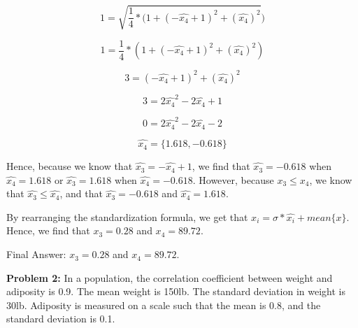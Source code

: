\documentclass{article}
\begin{document}
 \begin{displaymath}
 1 = \sqrt{\frac{1}{4}*(1+(-\hat{x_{4}}+1)^2+(\hat{x_{4}})^2})
 \end{displaymath}
 
 \begin{displaymath}
 1 = \frac{1}{4}*(1+(-\hat{x_{4}}+1)^2+(\hat{x_{4}})^2)
 \end{displaymath}
 
 \begin{displaymath}
 3 = (-\hat{x_{4}}+1)^2+(\hat{x_{4}})^2
 \end{displaymath}
 
 \begin{displaymath}
 3 = 2\hat{x_4}^2 - 2\hat{x_4} + 1
 \end{displaymath}
 
 \begin{displaymath}
 0 = 2\hat{x_4}^2 - 2\hat{x_4} - 2
 \end{displaymath}
 
 \begin{displaymath}
 \hat{x_4} = \{1.618, -0.618\}
 \end{displaymath}
 
 Hence, because we know that $\hat{x_3} = -\hat{x_4} + 1$, we find that $\hat{x_3} = -0.618$ when $\hat{x_4} = 1.618$ or $\hat{x_3} = 1.618$ when $\hat{x_4} = -0.618$. However, because $x_3 \leq x_4$, we know that $\hat{x_3} \leq \hat{x_4}$, and that $\hat{x_3} = -0.618$ and $\hat{x_4} = 1.618$.\newline
 
 By rearranging the standardization formula, we get that $x_i = \sigma * \hat{x_i} + mean\{x\}$. Hence, we find that $x_3 = 0.28$ and $x_4 = 89.72$.\newline
 
 Final Answer: $x_3 = 0.28$ and $x_4 = 89.72$. \newline

 \newpage
 
 \noindent\makebox[\linewidth]{\rule{\paperwidth}{0.4pt}}\newline
 
 \begin{center}
      \Large\textbf{Problem 2:} In a population, the correlation coefficient between weight and adiposity is 0.9. The mean weight is 150lb. The standard deviation in weight is 30lb. Adiposity is measured on a scale such that the mean is 0.8, and the standard deviation is 0.1.\par
 \end{center}
 
\end{document}
